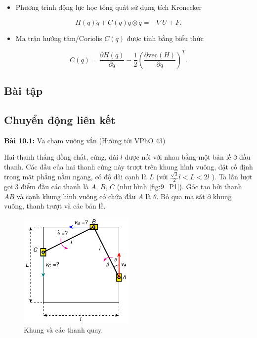 \begin{itemize}
        \item Phương trình động lực học tổng quát sử dụng tích Kronecker %
    \end{itemize}
    \begin{equation}
        H(q) \ddot{q} + C(q) \dot{q} \otimes \dot{q} = - \nabla U + F.
    \end{equation}
    \begin{itemize}
        \item Ma trận hướng tâm/Coriolis \(C(q)\) được tính bằng biểu thức
    \end{itemize}
    \begin{equation}
        C(q) = \dfrac{\partial H(q)}{\partial q} - \dfrac{1}{2} \left( \dfrac{\partial \text{vec}(H)}{\partial q} \right)^T.
    \end{equation}

\subsection{Bài tập}
\subsection*{Chuyển động liên kết}

\textbf{Bài 10.1:} Va chạm vuông vắn (Hướng tới VPhO 43)

Hai thanh thẳng đồng chất, cứng, dài \(l\) được nối với nhau bằng một bản lề ở đầu thanh. 
Các đầu của hai thanh cứng này trượt trên khung hình vuông, đặt cố định trong mặt phẳng nằm ngang, có độ dài cạnh là \(L\) (với \(\frac{\sqrt{3}}{2}l<L<2l\) ). 
Ta lần lượt gọi 3 điểm đầu các thanh là \(A\), \(B\), \(C\) (như hình \ref{fig:9_P1}). Góc tạo bởi thanh \(AB\) và cạnh khung hình vuông có chứa đầu \(A\) là \(\theta\). Bỏ qua ma sát ở khung vuông, thanh trượt và các bản lề.

\begin{figure}[!h]
    \centering
    \includegraphics[width=0.5\textwidth]{Tuan10/Figures/Square_collision/Square_Collision.pdf}
    \caption{Khung và các thanh quay.}
    \label{fig:Square_collision}
\end{figure}

